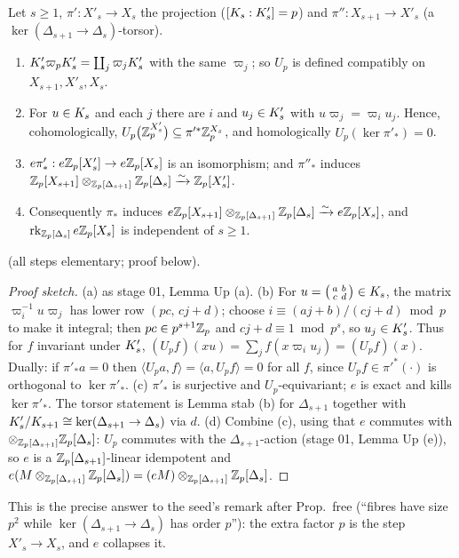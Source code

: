 \begin{lemma}\label{lem:s04-hida}
Let $s\ge1$, $\pi':X'_s\to X_s$ the projection ($[K_{s}:K'_{s}]=p$) and $\pi'':X_{s+1}\to X'_s$ (a $\ker(\Delta_{s+1}\to\Delta_s)$-torsor).
\begin{enumerate}[label=(\alph*)]
\item $K'_{s}\varpi_pK'_{s}=\coprod_j\varpi_jK'_{s}$ with the same $\varpi_j$; so $U_p$ is defined compatibly on $X_{s+1},X'_s,X_s$.
\item For $u\in K_{s}$ and each $j$ there are $i$ and $u_j\in K'_{s}$ with $u\varpi_j=\varpi_iu_j$. Hence, cohomologically,
  $U_p\big(\mathbb{Z}_p^{X'_s}\big)\subseteq\pi'^*\mathbb{Z}_p^{X_s}$, and homologically $U_p(\ker\pi'_*)=0$.
\item $e\pi'_*:e\mathbb{Z}_p[X'_s]\to e\mathbb{Z}_p[X_s]$ is an isomorphism; and $\pi''_*$ induces $\mathbb{Z}_p[X_{s+1}]\otimes_{\mathbb{Z}_p[\Delta_{s+1}]}\mathbb{Z}_p[\Delta_s]
  \xrightarrow{\sim}\mathbb{Z}_p[X'_s]$.
\item Consequently $\pi_*$ induces $e\mathbb{Z}_p[X_{s+1}]\otimes_{\mathbb{Z}_p[\Delta_{s+1}]}\mathbb{Z}_p[\Delta_s]\xrightarrow{\sim}e\mathbb{Z}_p[X_s]$, and
  $\operatorname{rk}_{\mathbb{Z}_p[\Delta_s]}e\mathbb{Z}_p[X_s]$ is independent of $s\ge1$.
\end{enumerate}
\sttoprove{} (all steps elementary; proof below).
\end{lemma}
\begin{proof}[Proof sketch]
(a) as stage 01, Lemma Up (a). (b) For $u=\left(\begin{smallmatrix}a&b\\c&d\end{smallmatrix}\right)\in K_{s}$, the matrix
$\varpi_i^{-1}u\varpi_j$ has lower row $(pc,\,cj+d)$; choose $i\equiv(aj+b)/(cj+d)\bmod p$ to make it integral; then
$pc\in p^{s+1}\mathbb{Z}_p$ and $cj+d\equiv1\bmod p^s$, so $u_j\in K'_{s}$. Thus for $f$ invariant under $K'_{s}$,
$(U_pf)(xu)=\sum_jf(x\varpi_iu_j)=(U_pf)(x)$. Dually: if $\pi'_*a=0$ then $\langle U_pa,f\rangle=\langle a,U_pf\rangle=0$ for all
$f$, since $U_pf\in\pi'^*(\cdot)$ is orthogonal to $\ker\pi'_*$. (c) $\pi'_*$ is surjective and $U_p$-equivariant; $e$ is exact and
kills $\ker\pi'_*$. The torsor statement is Lemma stab (b) for $\Delta_{s+1}$ together with $K'_{s}/K_{s+1}\cong\ker(\Delta_{s+1}\to\Delta_s)$ via $d$.
(d) Combine (c), using that $e$ commutes with $\otimes_{\mathbb{Z}_p[\Delta_{s+1}]}\mathbb{Z}_p[\Delta_s]$: $U_p$ commutes with the $\Delta_{s+1}$-action (stage 01, Lemma Up (e)), so $e$ is a $\mathbb{Z}_p[\Delta_{s+1}]$-linear idempotent and $e(M\otimes_{\mathbb{Z}_p[\Delta_{s+1}]}\mathbb{Z}_p[\Delta_s])=(eM)\otimes_{\mathbb{Z}_p[\Delta_{s+1}]}\mathbb{Z}_p[\Delta_s]$.
\end{proof}
\noindent This is the precise answer to the seed's remark after Prop.~free (``fibres have size $p^2$ while
$\ker(\Delta_{s+1}\to\Delta_s)$ has order $p$''): the extra factor $p$ is the step $X'_s\to X_s$, and $e$ collapses it.

